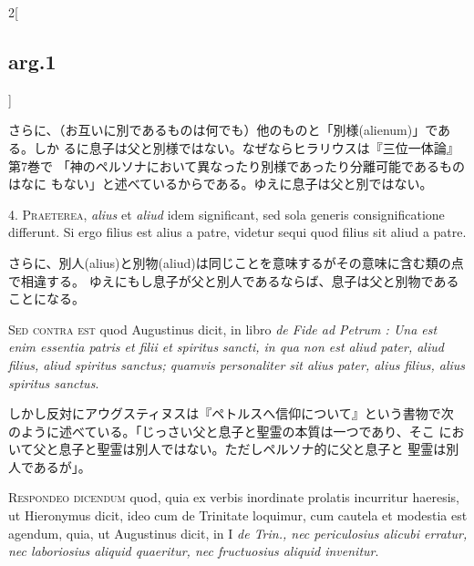 \documentclass[paper=a4paper,fontsize=10pt,jafontsize=9pt,titlepage]{jlreq}
\begin{document}
\begin{paracol}{2}[\subsection{arg.1}]
\switchcolumn

さらに、（お互いに別であるものは何でも）他のものと「別様(alienum)」である。しか
 るに息子は父と別様ではない。なぜならヒラリウスは『三位一体論』第7巻で
 「神のペルソナにおいて異なったり別様であったり分離可能であるものはなに
 もない」と述べているからである。ゆえに息子は父と別ではない。


4. {\scshape Praeterea}, {\itshape alius} et {\itshape aliud} idem significant, sed sola generis
consignificatione differunt. Si ergo filius est alius a patre, videtur
sequi quod filius sit aliud a patre.

\switchcolumn

さらに、別人(alius)と別物(aliud)は同じことを意味するがその意味に含む類の点で相違する。
 ゆえにもし息子が父と別人であるならば、息子は父と別物であることになる。

\switchcolumn*[\subsection{s.c.}]

{\scshape Sed contra est} quod Augustinus dicit, in libro {\itshape de
 Fide ad Petrum : Una
est enim essentia patris et filii et spiritus sancti, in qua non est
aliud pater, aliud filius, aliud spiritus sanctus; quamvis
personaliter sit alius pater, alius filius, alius spiritus sanctus}.

\switchcolumn

しかし反対にアウグスティヌスは『ペトルスへ信仰について』という書物で次
 のように述べている。「じっさい父と息子と聖霊の本質は一つであり、そこ
 において父と息子と聖霊は別人ではない。ただしペルソナ的に父と息子と
 聖霊は別人であるが」。


{\scshape Respondeo dicendum} quod, quia ex verbis inordinate prolatis incurritur
haeresis, ut Hieronymus dicit, ideo cum de Trinitate loquimur, cum
cautela et modestia est agendum, quia, ut Augustinus dicit, in I {\itshape de
Trin., nec periculosius alicubi erratur, nec laboriosius aliquid
quaeritur, nec fructuosius aliquid invenitur}.


\end{paracol}
\end{document}

